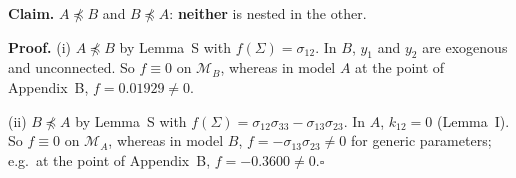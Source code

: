 \documentclass[10pt,a4paper]{article}
\newcommand{\nnest}{\not\preceq}
\begin{document}
\par\bigskip
\noindent\textbf{Claim.} $A \nnest B$ and $B \nnest A$: \textbf{neither} is nested in the other.\par\smallskip
\noindent\textbf{Proof.} (i) $A\nnest B$ by Lemma~S with $f(\Sigma)=\sigma_{12}$. In $B$, $y_1$ and $y_2$ are exogenous and unconnected. So $f\equiv0$ on $\mathcal M_B$, whereas in model $A$ at the point of Appendix~B, $f=0.01929\neq0$.\par\smallskip
\noindent(ii) $B\nnest A$ by Lemma~S with $f(\Sigma)=\sigma_{12}\sigma_{33} - \sigma_{13}\sigma_{23}$. In $A$, $k_{12}=0$ (Lemma~I). So $f\equiv0$ on $\mathcal M_A$, whereas in model $B$, $f=-\sigma_{13}\sigma_{23}\neq0$ for generic parameters; e.g.\ at the point of Appendix~B, $f=-0.3600\neq0$.\hfill$\square$\par\medskip
{}

\clearpage
\end{document}

